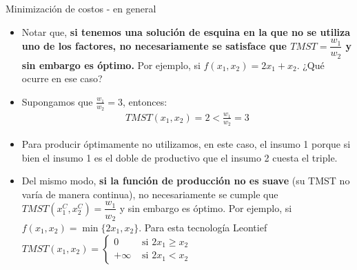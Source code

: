 \documentclass{beamer}
\theoremstyle{definition}
\begin{document}
\begin{frame}{Minimización de costos - en general}
	\begin{itemize}
 \item \small{Notar que, \textbf{si tenemos una solución de esquina en la que no se utiliza uno de los factores, no necesariamente se satisface que $TMST=\dfrac{w_1}{w_2}$ y sin embargo es óptimo.} Por ejemplo, si $f(x_1,x_2)=2x_1+x_2$. ¿Qué ocurre en ese caso?}
\item Supongamos que $\frac{w_{1}}{w_{2}}=3$, entonces:
\begin{align}
TMST(x_{1},x_{2})=2<\frac{w_{1}}{w_{2}}=3 \label{eq}
\end{align}
\item \small{Para producir óptimamente no utilizamos, en este caso, el insumo 1 porque si bien el insumo 1 es el doble de productivo que el insumo 2 cuesta el triple.}

\item \small{Del mismo modo, \textbf{si la función
de producción no es suave} (su TMST no varía de manera continua), no necesariamente se cumple que $TMST(x_1^C,x_2^C)=\dfrac{w_1}{w_2}$ y sin embargo es óptimo. Por ejemplo, si $f(x_1,x_2)=\min\lbrace 2x_1,x_2\rbrace$. Para esta tecnología Leontief $TMST(x_1,x_2)=\begin{cases} 0 &\text{ si } 2x_1 \geq x_2\\  +\infty &\text{ si } 2x_1 <x_2\end{cases}$} %

\end{itemize}
\end{frame}	
\end{document}
